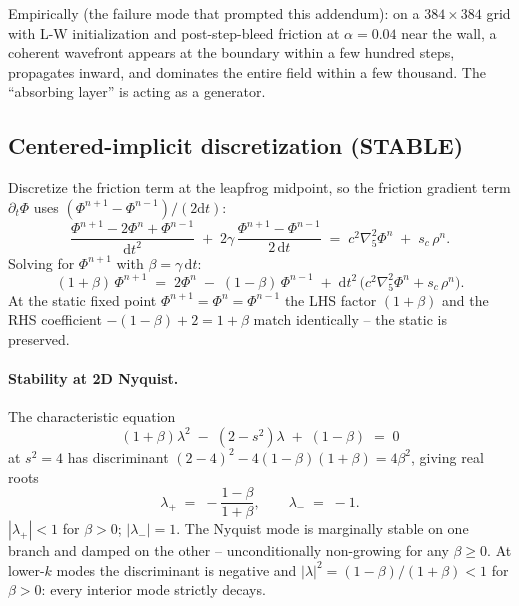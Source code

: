 \documentclass[11pt,a4paper]{article}
\newcommand{\dd}{\mathrm{d}}
\begin{document}
Empirically (the failure mode that prompted this addendum): on a
$384 \times 384$ grid with L-W initialization and post-step-bleed
friction at $\alpha = 0.04$ near the wall, a coherent wavefront
appears at the boundary within a few hundred steps, propagates
inward, and dominates the entire field within a few thousand.  The
``absorbing layer'' is acting as a generator.

\subsection{Centered-implicit discretization (STABLE)}

Discretize the friction term at the leapfrog midpoint, so the friction
gradient term $\partial_t \Phi$ uses $(\Phi^{n+1} - \Phi^{n-1})/(2\dd
t)$:
\begin{equation}
  \frac{\Phi^{n+1} - 2\Phi^n + \Phi^{n-1}}{\dd t^2}
  \;+\;
  2\gamma\,\frac{\Phi^{n+1} - \Phi^{n-1}}{2\,\dd t}
  \;=\;
  c^2\nabla^2_5 \Phi^n \;+\; s_c\,\rho^n.
\end{equation}
Solving for $\Phi^{n+1}$ with $\beta = \gamma\,\dd t$:
\begin{equation}
  (1 + \beta)\,\Phi^{n+1} \;=\; 2\Phi^n \;-\; (1-\beta)\,\Phi^{n-1}
  \;+\; \dd t^2\,\bigl(c^2\nabla^2_5 \Phi^n + s_c\,\rho^n\bigr).
  \label{eq:centered}
\end{equation}
At the static fixed point $\Phi^{n+1} = \Phi^n = \Phi^{n-1}$ the
LHS factor $(1+\beta)$ and the RHS coefficient $-(1-\beta) + 2 = 1+\beta$
match identically -- the static is preserved.

\paragraph{Stability at 2D Nyquist.}  The characteristic equation
\begin{equation}
  (1+\beta)\lambda^2 \;-\; (2 - s^2)\lambda \;+\; (1-\beta) \;=\; 0
\end{equation}
at $s^2 = 4$ has discriminant
$(2 - 4)^2 - 4(1-\beta)(1+\beta) = 4\beta^2$, giving real roots
\begin{equation}
  \lambda_+ \;=\; -\frac{1 - \beta}{1 + \beta},
  \qquad
  \lambda_- \;=\; -1.
\end{equation}
$|\lambda_+| < 1$ for $\beta > 0$; $|\lambda_-| = 1$.  The Nyquist
mode is marginally stable on one branch and damped on the other --
unconditionally non-growing for any $\beta \ge 0$.  At lower-$k$ modes
the discriminant is negative and $|\lambda|^2 = (1-\beta)/(1+\beta) <
1$ for $\beta > 0$: every interior mode strictly decays.
\end{document}
